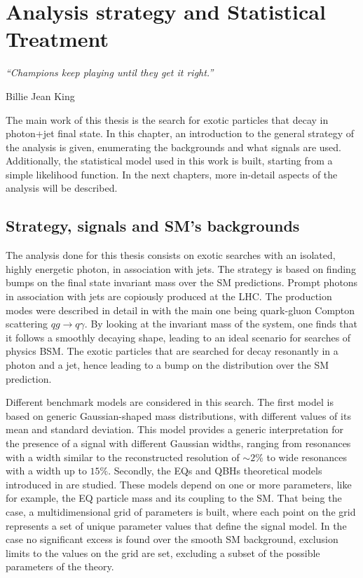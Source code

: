 \chapter{Analysis strategy and Statistical Treatment}
\label{ch:strategy}
\epigraph{\emph{“Champions keep playing until they get it right.”}}{Billie Jean King}







The main work of this thesis is the search for exotic particles that decay in photon+jet final state. In this chapter, an introduction to the general strategy of the analysis is given, enumerating the backgrounds and what signals are used. Additionally, the statistical model used in this work is built, starting from a simple likelihood function. In the next chapters, more in-detail aspects of the analysis will be described.






\section{Strategy, signals and SM's backgrounds}
\label{sec:strategy:strategy}

The analysis done for this thesis consists on exotic searches with an isolated, highly energetic photon, in association with jets. The strategy is based on finding bumps on the final state invariant mass over the \ac{SM} predictions.
Prompt photons in association with jets are copiously produced at the \ac{LHC}. The production modes were described in detail in \Sect{\ref{subsec:theory:sm:prompt_photon}} with the main one being quark-gluon Compton scattering \(qg \to q \gamma\). By looking at the invariant mass \myj of the \gammajet system, one finds that it follows a smoothly decaying shape, leading to an ideal scenario for searches of physics \ac{BSM}.
The exotic particles that are searched for decay resonantly in a photon and a jet, hence leading to a bump on  the \myj distribution over the \ac{SM} prediction.


Different benchmark models are considered in this search. The first model is based on generic Gaussian-shaped mass distributions, with different values of its mean and standard deviation. This model provides a generic interpretation for the presence of a signal with different Gaussian widths, ranging from resonances with a width similar to the reconstructed \myj resolution of \(\sim 2\%\) to wide resonances with a width up to \(15\%\).
Secondly, the \acfp{EQ} and \acfp{QBH} theoretical models introduced in \Sect{\ref{sec:theory:bsm}} are studied. These models  depend on one or more parameters, like for example, the \ac{EQ} particle mass and its coupling to the \ac{SM}. That being the case, a multidimensional grid of parameters is built, where each point on the grid represents a set of unique parameter values that define the signal model. In the case no significant excess is found over the smooth \ac{SM} background, exclusion limits to the values on the grid are set, excluding a subset of the possible parameters of the theory.


